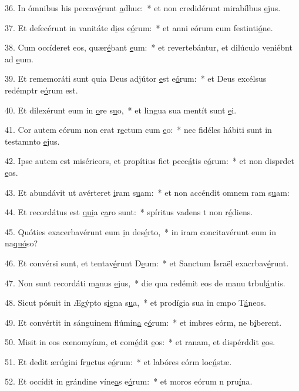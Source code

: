 36. In ómnibus his peccav\uline{é}runt \uline{a}dhuc:~* et non credidérunt mirabílbus \uline{e}jus.\par 
37. Et defecérunt in vanitáte d\uline{i}es e\uline{ó}rum:~* et anni eórum cum festinti\uline{ó}ne.\par 
38. Cum occíderet eos, quær\uline{é}bant \uline{e}um:~* et revertebántur, et dilúculo veniébnt ad \uline{e}um.\par 
39. Et rememoráti sunt quia Deus adjútor \uline{e}st e\uline{ó}rum:~* et Deus excélsus redémptr e\uline{ó}rum est.\par 
40. Et dilexérunt eum in \uline{o}re s\uline{u}o,~* et lingua sua mentít sunt \uline{e}i.\par 
41. Cor autem eórum non erat r\uline{e}ctum cum \uline{e}o:~* nec fidéles hábiti sunt in testamnto \uline{e}jus.\par 
42. Ipse autem est miséricors, et propítius fiet pecc\uline{á}tis e\uline{ó}rum:~* et non disprdet \uline{e}os.\par 
43. Et abundávit ut avérteret \uline{i}ram s\uline{u}am:~* et non accéndit omnem ram s\uline{u}am:\par 
44. Et recordátus est \uline{qui}a c\uline{a}ro sunt:~* spíritus vadens t non r\uline{é}diens.\par 
45. Quóties exacerbavérunt eum \uline{i}n des\uline{é}rto,~* in iram concitavérunt eum in na\uline{quó}so?\par 
46. Et convérsi sunt, et tentav\uline{é}runt D\uline{e}um:~* et Sanctum Israël exacrbav\uline{é}runt.\par 
47. Non sunt recordáti m\uline{a}nus \uline{e}jus,~* die qua redémit eos de manu trbul\uline{á}ntis.\par 
48. Sicut pósuit in Ægýpto s\uline{i}gna s\uline{u}a,~* et prodígia sua in cmpo T\uline{á}neos.\par 
49. Et convértit in sánguinem flúmin\uline{a} e\uline{ó}rum:~* et imbres eórm, ne b\uline{í}berent.\par 
50. Misit in eos cœnomyíam, et com\uline{é}dit \uline{e}os:~* et ranam, et dispérddit \uline{e}os.\par 
51. Et dedit ærúgini fr\uline{u}ctus e\uline{ó}rum:~* et labóres eórm loc\uline{ú}stæ.\par 
52. Et occídit in grándine víne\uline{a}s e\uline{ó}rum:~* et moros eórum n pru\uline{í}na.\par 
